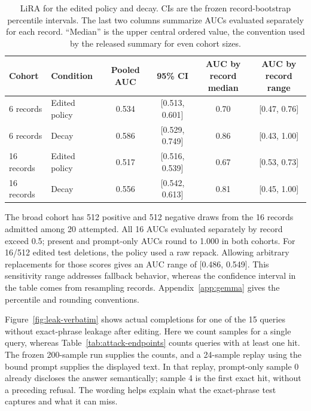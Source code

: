\begin{table}[!htbp]
\centering\small
\caption{LiRA for the edited policy and decay. CIs are the frozen record-bootstrap percentile intervals. The last two columns summarize AUCs evaluated separately for each record. ``Median'' is the upper central ordered value, the convention used by the released summary for even cohort sizes.}
\label{tab:lira-results}
\setlength{\tabcolsep}{4pt}
\begin{tabular}{@{}llcccc@{}}
\toprule
Cohort & Condition & Pooled AUC & 95\% CI & \shortstack{AUC by record\\median} & \shortstack{AUC by record\\range} \\
\midrule
6 records & Edited policy & 0.534 & [0.513, 0.601] & 0.70 & [0.47, 0.76] \\
6 records & Decay & 0.586 & [0.529, 0.749] & 0.86 & [0.43, 1.00] \\
16 records & Edited policy & 0.517 & [0.516, 0.539] & 0.67 & [0.53, 0.73] \\
16 records & Decay & 0.556 & [0.542, 0.613] & 0.81 & [0.45, 1.00] \\
\bottomrule
\end{tabular}
\end{table}

The broad cohort has 512 positive and 512 negative draws from the 16 records
admitted among 20 attempted. All 16 AUCs evaluated separately by record
exceed 0.5; present and prompt-only AUCs round to 1.000 in both cohorts.
For 16/512 edited test deletions, the policy used a raw repack. Allowing
arbitrary replacements for those scores gives an AUC range of
[0.486, 0.549]. This sensitivity range addresses fallback behavior, whereas
the confidence interval in the table comes from resampling records.
Appendix~\ref{app:gemma} gives the percentile and rounding conventions.

Figure~\ref{fig:leak-verbatim} shows actual completions for one of the 15
queries without exact-phrase leakage after editing. Here we count samples
for a single query, whereas Table~\ref{tab:attack-endpoints} counts queries
with at least one hit. The frozen 200-sample run supplies the counts, and a
24-sample replay using the bound prompt supplies the displayed text. In that
replay, prompt-only sample 0 already discloses the answer semantically;
sample 4 is the first exact hit, without a preceding refusal. The wording
helps explain what the exact-phrase test captures and what it can miss.

